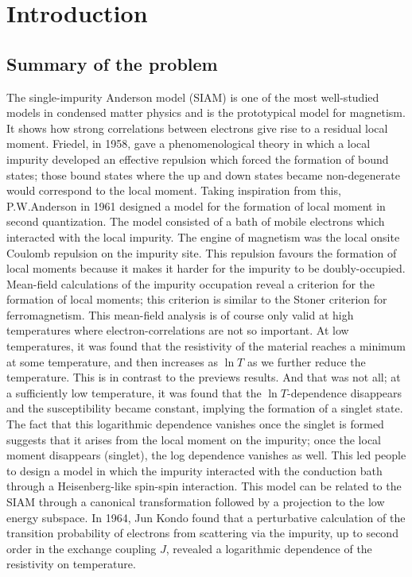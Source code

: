 \documentclass[12pt,twoside]{report}
\numberwithin{equation}{section}
\begin{document}
\chapter{Introduction}
\section{Summary of the problem}
The single-impurity Anderson model (SIAM) is one of the most well-studied models in condensed matter physics and is the prototypical model for magnetism.
It shows how strong correlations between electrons give rise to a residual local moment. Friedel\cite{Friedel}, in 1958, gave a phenomenological theory in which a local impurity developed an effective repulsion which forced the formation of bound states; those bound states where the up and down states became non-degenerate would correspond to the local moment.
Taking inspiration from this, P.W.Anderson\cite{Anderson} in 1961 designed a model for the formation of local moment in second quantization.
The model consisted of a bath of mobile electrons which interacted with the local impurity.
The engine of magnetism was the local onsite Coulomb repulsion on the impurity site.
This repulsion favours the formation of local moments because it makes it harder for the impurity to be doubly-occupied.
\pb Mean-field calculations of the impurity occupation reveal a criterion for the formation of local moments; this criterion is similar to the Stoner criterion for ferromagnetism. This mean-field analysis is of course only valid at high temperatures where electron-correlations are not so important. At low temperatures, it was found that the resistivity of the material reaches a minimum at some temperature, and then increases as \(\ln T\) as we further reduce the temperature. This is in contrast to the previews results. And that was not all; at a sufficiently low temperature, it was found that the \(\ln T\)-dependence disappears and the susceptibility became constant, implying the formation of a singlet state.
\pb The fact that this logarithmic dependence vanishes once the singlet is formed suggests that it arises from the local moment on the impurity; once the local moment disappears (singlet), the log dependence vanishes as well.
This led people to design a model in which the impurity interacted with the conduction bath through a Heisenberg-like spin-spin interaction.
This model can be related to the SIAM through a canonical transformation followed by a projection to the low energy subspace.
In 1964, Jun Kondo\cite{Kondo} found that a perturbative calculation of the transition probability of electrons from scattering via the impurity, up to second order in the exchange coupling \(J\), revealed a logarithmic dependence of the resistivity on temperature.
\end{document}
